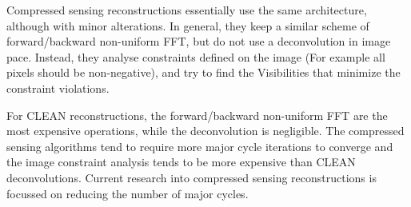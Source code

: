 Compressed sensing reconstructions essentially use the same architecture, although with minor alterations. In general, they keep a similar scheme of forward/backward non-uniform FFT, but do not use a deconvolution in image pace. Instead, they analyse constraints defined on the image (For example all pixels should be non-negative), and try to find the Visibilities that minimize the constraint violations.

For CLEAN reconstructions, the forward/backward non-uniform FFT are the most expensive operations, while the deconvolution is negligible. The compressed sensing algorithms tend to require more major cycle iterations to converge and the image constraint analysis tends to be more expensive than CLEAN deconvolutions. Current research into compressed sensing reconstructions is focussed on reducing the number of major cycles\cite{dabbech2018cygnus}. 











